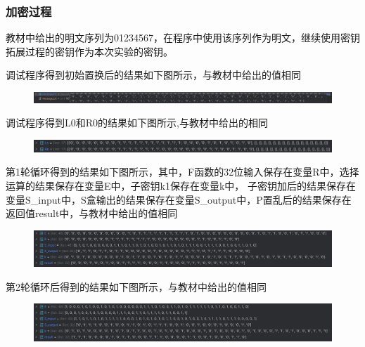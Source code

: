 \documentclass[a4paper,11pt,UTF8]{ctexart}
\newcommand{\bottomcaption}{%
\setlength{\abovecaptionskip}{6pt}%
\setlength{\belowcaptionskip}{6pt}%
\caption}
\newcommand{\xiaowuhao}{\fontsize{9pt}{\baselineskip}\selectfont}   %
\begin{document}
        \subsubsection{加密过程}
            教材中给出的明文序列为01234567，在程序中使用该序列作为明文，继续使用密钥拓展过程的密钥作为本次实验的密钥。\par
            调试程序得到初始置换后的结果如下图所示，与教材中给出的值相同
            \begin{figure}[H]
                \centering
                \includegraphics[width=15cm]{初始置换.png}
                \bottomcaption{\xiaowuhao{初始置换后结果}}
            \end{figure}
            调试程序得到L0和R0的结果如下图所示,与教材中给出的相同
            \begin{figure}[H]
                \centering
                \includegraphics[width=15cm]{L0R0.png}
                \bottomcaption{\xiaowuhao{得到L0和R0的结果}}
            \end{figure}
\newpage
            第1轮循环得到的结果如下图所示，其中，F函数的32位输入保存在变量R中，选择运算的结果保存在变量E中，子密钥k1保存在变量k中，
            子密钥加后的结果保存在变量S\_input中，S盒输出的结果保存在变量S\_output中，P置乱后的结果保存在返回值result中，与教材中给出的值相同
            \begin{figure}[H]
                \centering
                \includegraphics[width=15cm]{N1.png}
                \bottomcaption{\xiaowuhao{第1轮循环的结果}}
            \end{figure}
            第2轮循环后得到的结果如下图所示，与教材中给出的值相同
            \begin{figure}[H]
                \centering
                \includegraphics[width=15cm]{N2.png}
                \bottomcaption{\xiaowuhao{第2轮循环的结果}}
            \end{figure}
\end{document}
